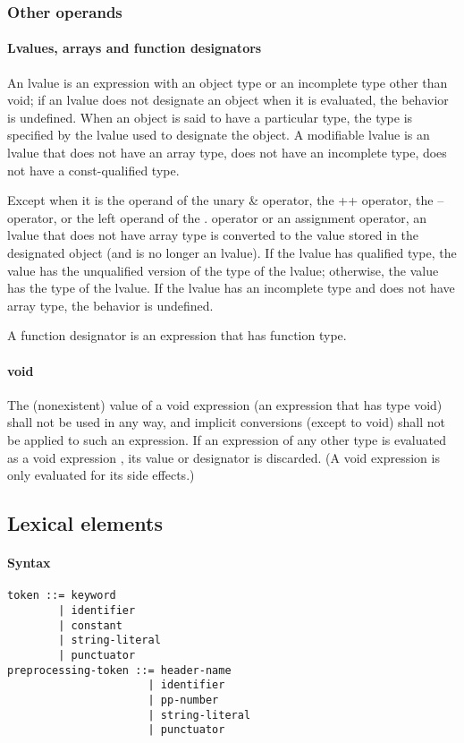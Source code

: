 \documentclass{article}
\begin{document}
\subsubsection{Other operands}
\paragraph{Lvalues, arrays and function designators}
An lvalue is an expression with an object type or an incomplete type other than void; 
if an lvalue does not designate an object when it is evaluated, the behavior is undefined.
When an object is said to have a particular type, the type is specified by the lvalue 
used to designate the object.  A modifiable lvalue is an lvalue that does not have an 
array type, does not have an incomplete type, does not have a const-qualified type.
\linebreak

Except when it is the operand of the unary \& operator, the ++ operator, the -- operator,
or the left operand of the . operator or an assignment operator, an lvalue that does not 
have array type is converted to the value stored in the designated object (and is no 
longer an lvalue).  If the lvalue has qualified type, the value has the unqualified 
version of the type of the lvalue; otherwise, the value has the type of the lvalue. If 
the lvalue has an incomplete type and does not have array type, the behavior is undefined.
\linebreak

A function designator is an expression that has function type.
\linebreak

\paragraph*{void}
The (nonexistent) value of a void expression (an expression that has type void) shall not 
be used in any way, and implicit conversions (except to void) shall not be applied to 
such an expression.  If an expression of any other type is evaluated as a void expression
, its value or designator is discarded. (A void expression is only evaluated for its 
side effects.)
\pagebreak

\subsection{Lexical elements}
\paragraph*{Syntax}
\begin{lstlisting}[language=bnf]
token ::= keyword    
        | identifier
        | constant   
        | string-literal
        | punctuator
preprocessing-token ::= header-name 
                      | identifier
                      | pp-number   
                      | string-literal
                      | punctuator
\end{lstlisting}
\end{document}
